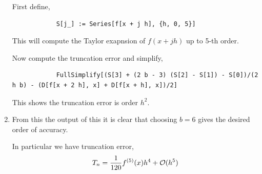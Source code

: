 \documentclass[10pt]{article}
\begin{document}
\begin{solution}[Solution]
\begin{enumerate}[label=(\alph*)]
        First define,
        \begin{lstlisting}
            S[j_] := Series[f[x + j h], {h, 0, 5}]
        \end{lstlisting}
        
        This will compute the Taylor exapnsion of \( f(x+j h) \) up to 5-th order.

        Now compute the truncation error and simplify,
        \begin{lstlisting}
            FullSimplify[(S[3] + (2 b - 3) (S[2] - S[1]) - S[0])/(2 h b) - (D[f[x + 2 h], x] + D[f[x + h], x])/2]
        \end{lstlisting}

        This shows the truncation error is order \( h^2 \).

    \item 
        From this the output of this it is clear that choosing \( b=6 \) gives the desired order of accuracy.

        In particular we have truncation error,
        \begin{align*}
            T_n = \frac{1}{120}f^{(5)}(x)h^4 + \mathcal{O}(h^5)
        \end{align*}       

\end{enumerate}
\end{solution}
\end{document}
